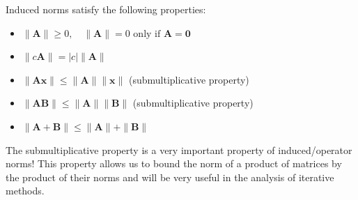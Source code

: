 Induced norms satisfy the following properties:
\begin{itemize}
    \item $\|\mathbf{A}\| \geq 0, \quad \|\mathbf{A}\| = 0 \text{ only if } \mathbf{A} = \mathbf{0}$
    \item $\|c\mathbf{A}\| = |c|\|\mathbf{A}\|$
    \item $\|\mathbf{Ax}\| \leq \|\mathbf{A}\| \|\mathbf{x}\|$ (submultiplicative property)
    \item $\|\mathbf{AB}\| \leq \|\mathbf{A}\| \|\mathbf{B}\|$ (submultiplicative property)
    \item $\|\mathbf{A} + \mathbf{B}\| \leq \|\mathbf{A}\| + \|\mathbf{B}\|$
\end{itemize}
The submultiplicative property is a very important property of induced/operator norms! This property allows us to bound the norm of a product of matrices by the product of their norms and will be very useful in the analysis of iterative methods.

